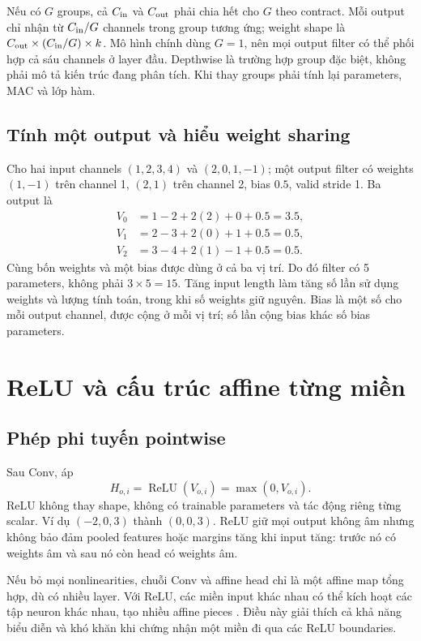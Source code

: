 \documentclass[11pt,a4paper]{article}
\newcommand{\relu}{\operatorname{ReLU}}
\theoremstyle{definition}
\begin{document}
Nếu có $G$ groups, cả $C_{\rm in}$ và $C_{\rm out}$ phải chia hết cho
$G$ theo contract. Mỗi output chỉ nhận từ $C_{\rm in}/G$ channels trong
group tương ứng; weight shape là
$C_{\rm out}\times(C_{\rm in}/G)\times k$. Mô hình chính dùng $G=1$,
nên mọi output filter có thể phối hợp cả sáu channels ở layer đầu.
Depthwise là trường hợp group đặc biệt, không phải mô tả kiến trúc đang
phân tích. Khi thay groups phải tính lại parameters, MAC và lớp hàm.

\subsection{Tính một output và hiểu weight sharing}
Cho hai input channels $(1,2,3,4)$ và $(2,0,1,-1)$; một output filter có
weights $(1,-1)$ trên channel 1, $(2,1)$ trên channel 2, bias $0.5$,
valid stride 1. Ba output là
\begin{align}
V_0&=1-2+2(2)+0+0.5=3.5,\\
V_1&=2-3+2(0)+1+0.5=0.5,\\
V_2&=3-4+2(1)-1+0.5=0.5.
\end{align}
Cùng bốn weights và một bias được dùng ở cả ba vị trí. Do đó filter có
5 parameters, không phải $3\times5=15$. Tăng input length làm tăng số
lần sử dụng weights và lượng tính toán, trong khi số weights giữ nguyên.
Bias là một số cho mỗi output channel, được cộng ở mỗi vị trí; số lần
cộng bias khác số bias parameters.

\section{ReLU và cấu trúc affine từng miền}
\subsection{Phép phi tuyến pointwise}
Sau Conv, áp
\begin{equation}
H_{o,i}=\relu(V_{o,i})=\max(0,V_{o,i}).
\end{equation}
ReLU không thay shape, không có trainable parameters và tác động riêng
từng scalar. Ví dụ $(-2,0,3)$ thành $(0,0,3)$. ReLU giữ mọi output
không âm nhưng không bảo đảm pooled features hoặc margins tăng khi
input tăng: trước nó có weights âm và sau nó còn head có weights âm.

Nếu bỏ mọi nonlinearities, chuỗi Conv và affine head chỉ là một affine
map tổng hợp, dù có nhiều layer. Với ReLU, các miền input khác nhau có
thể kích hoạt các tập neuron khác nhau, tạo nhiều affine pieces
\cite{montufar}. Điều này giải thích cả khả năng biểu diễn và khó khăn
khi chứng nhận một miền đi qua các ReLU boundaries.
\end{document}
